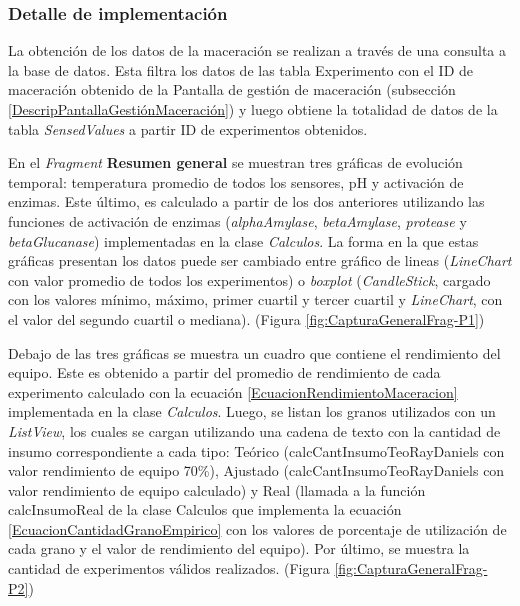             \subsubsection{Detalle de implementación}
            \par La obtención de los datos de la maceración se realizan a través de una consulta a la base de datos. Esta filtra los datos de las tabla Experimento con el ID de maceración obtenido de la Pantalla de gestión de maceración (subsección \ref{DescripPantallaGestiónMaceración}) y luego obtiene la totalidad de datos de la tabla \textit{SensedValues} a partir ID de experimentos obtenidos.
            
            \par En el \textit{Fragment} \textbf{Resumen general} se muestran tres gráficas de evolución temporal: temperatura promedio de todos los sensores, pH y activación de enzimas. Este último, es calculado a partir de los dos anteriores utilizando las funciones de activación de enzimas (\textit{alphaAmylase}, \textit{betaAmylase}, \textit{protease} y \textit{betaGlucanase}) implementadas en la clase \textit{Calculos}. La forma en la que estas gráficas presentan los datos puede ser cambiado entre gráfico de lineas (\textit{LineChart} con valor promedio de todos los experimentos) o \textit{boxplot} (\textit{CandleStick}, cargado con los valores mínimo, máximo, primer cuartil y tercer cuartil y \textit{LineChart}, con el valor del segundo cuartil o mediana). (Figura \ref{fig:CapturaGeneralFrag-P1})
            
            \par Debajo de las tres gráficas se muestra un cuadro que contiene el rendimiento del equipo. Este es obtenido a partir del promedio de rendimiento de cada experimento calculado con la ecuación \ref{EcuacionRendimientoMaceracion} implementada en la clase \textit{Calculos}. Luego, se listan los granos utilizados con un \textit{ListView}, los cuales se cargan utilizando una cadena de texto con la cantidad de insumo correspondiente a cada tipo: Teórico (calcCantInsumoTeoRayDaniels con valor rendimiento de equipo 70\%), Ajustado (calcCantInsumoTeoRayDaniels con valor rendimiento de equipo calculado) y Real (llamada a la función calcInsumoReal de la clase Calculos que implementa la ecuación  \ref{EcuacionCantidadGranoEmpirico} con los valores de porcentaje de utilización de cada grano y el valor de rendimiento del equipo). Por último, se muestra la cantidad de experimentos válidos realizados. (Figura \ref{fig:CapturaGeneralFrag-P2})
            
